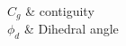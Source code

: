 \documentclass[12pt, a4paper, twoside]{Thesis} %
\begin{document}
%




\clearpage %


{
$C_g$ & contiguity \\
$\phi_d$ & Dihedral angle
}
\end{document}
